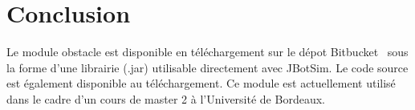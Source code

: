 \documentclass{article}
\begin{document}
\section{Conclusion}
Le module obstacle est disponible en téléchargement sur le dépot Bitbucket~\cite{obstacle} sous la forme d'une librairie (.jar) utilisable directement avec JBotSim. Le code source est également disponible au téléchargement. Ce module est actuellement utilisé dans le cadre d'un cours de master 2 à l'Université de Bordeaux.



\end{document}
